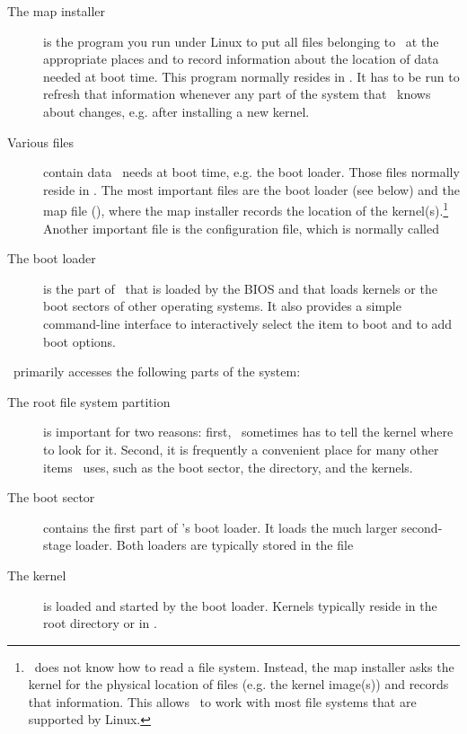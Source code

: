 \begin{description}
  \item[The map installer] is the program you run under Linux to put all
    files belonging to \LILO\ at the appropriate places and to record
    information about the location of data needed at boot time. This program
    normally resides in . It has to be run to refresh that
    information whenever any part of the system that \LILO\ knows about
    changes, e.g. after installing a new kernel.
  \item[Various files] contain data \LILO\ needs at boot time, e.g. the
    boot loader. Those files normally reside in . The most
    important files are the boot loader (see below) and the map file
    (), where the map installer records the location of
    the kernel(s).\footnote{\LILO\ does not know how to read a file system.
    Instead, the map installer asks the kernel for the physical location of
    files (e.g. the kernel image(s)) and records that information. This
    allows \LILO\ to work with most file systems that are supported by
    Linux.} Another important file is the configuration file, which is
    normally called 
  \item[The boot loader] is the part of \LILO\ that is loaded by the BIOS
    and that loads kernels or the boot sectors of other operating systems.
    It also provides a simple command-line interface to interactively
    select the item to boot and to add boot options.
\end{description}

\LILO\ primarily accesses the following parts of the system:

\begin{description}
  \item[The root file system partition] is important for two reasons: first,
    \LILO\ sometimes has to tell the kernel where to look for it. Second, it
    is frequently a convenient place for many other items \LILO\ uses, such
    as the boot sector, the  directory, and the kernels.
  \item[The boot sector] contains the first part of \LILO's boot loader. It
    loads the much larger second-stage loader. Both loaders are typically
    stored in the file 
  \item[The kernel] is loaded and started by the boot loader. Kernels
    typically reside in the root directory or in .
\end{description}

